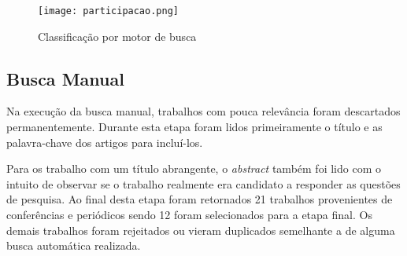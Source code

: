 \begin{figure}[htb]
	\centering
	\texttt{[image: participacao.png]}
	\caption{Classificação por motor de busca}
	\label{fig:paticipacao}
\end{figure}
\newpage
\subsection{Busca Manual}
Na execução da busca manual, trabalhos com pouca relevância foram descartados permanentemente. Durante esta etapa foram lidos primeiramente o título e as palavra-chave dos artigos para incluí-los. 

Para os trabalho com um título abrangente, o \textit{abstract} também foi lido com o intuito de observar se o trabalho realmente era candidato a responder as questões de pesquisa. Ao final desta etapa foram retornados 21 trabalhos provenientes de conferências e periódicos sendo 12 foram selecionados para a etapa final. Os demais trabalhos foram rejeitados ou vieram duplicados semelhante a de alguma busca automática realizada.

